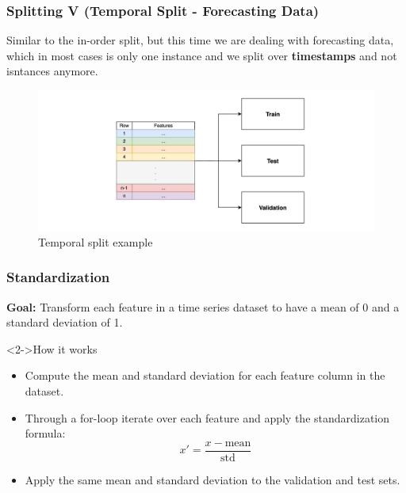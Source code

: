 \documentclass[t,english]{beamer}
\begin{document}
\begin{frame}
  \frametitle{Splitting V (Temporal Split - Forecasting Data)}
  Similar to the in-order split, but this time we are dealing with forecasting data, which in most cases is only one instance and we split over \textbf{timestamps} and not isntances anymore.

  \begin{figure}[H]
    \includegraphics[width=1\textwidth]{figures/splitting/temporal_split.png}
    \caption{Temporal split example}
    \label{fig:temporal_split}
  \end{figure}
\end{frame}

\begin{frame}
  \frametitle{Standardization}
  \textbf{Goal:} Transform each feature in a time series dataset to have a mean of 0 and a standard deviation of 1.

  \begin{block}<2->{How it works}
    \begin{itemize}
      \item<2-> Compute the mean and standard deviation for each feature column in the dataset.
      \item<3-> Through a for-loop iterate over each feature and apply the standardization formula:
            \begin{equation}
              x' = \frac{x - \text{mean}}{\text{std}}
            \end{equation}
      \item<4-> Apply the same mean and standard deviation to the validation and test sets.
    \end{itemize}
  \end{block}
\end{frame}
\end{document}
